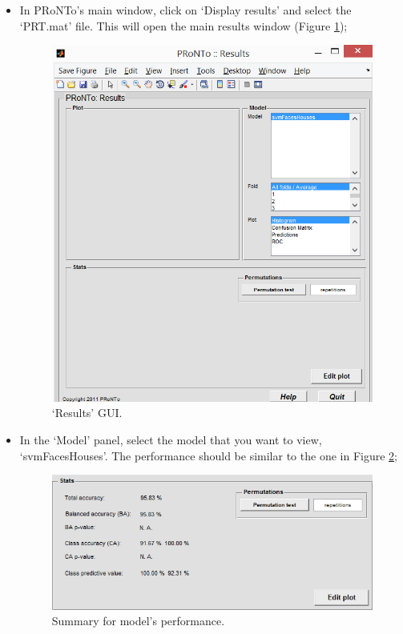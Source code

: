 \begin{itemize}
	
	\item In PRoNTo's main window, click on `Display results' and select the `PRT.mat' file. This will open the main results window (Figure \ref{fig:results});
	
\begin{figure}[h!]
	\centering
		\includegraphics[scale=0.6]{images/Tutorial/classification/results.png}
	\caption{`Results' GUI.}
	\label{fig:results}
\end{figure}
	
	
	\item In the `Model' panel, select the model that you want to view, `svmFacesHouses'. The performance should be similar to the one in Figure \ref{fig:stats};
	
	\begin{figure}[h!]
	\centering
		\includegraphics[scale=0.75]{images/Tutorial/classification/stats.png}
	\caption{Summary for model's performance.}
	\label{fig:stats}
\end{figure}
	

\end{itemize}
